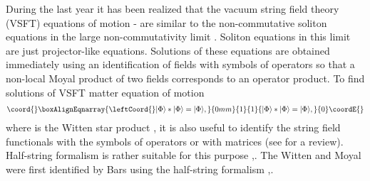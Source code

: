 \documentclass[a4paper,12pt]{article}
\begin{document}
During the last year it has been realized that
the  vacuum string field theory (VSFT) equations of motion
\cite{0012251}-\cite{0111129} are similar  to the non-commutative soliton
equations  in the large non-commutativity limit \cite{GMS}.
Soliton equations  in this limit are just  projector-like equations.
Solutions of these equations are obtained immediately using an identification
of fields with symbols of operators so that a non-local Moyal product
of two fields  corresponds to an operator product.
To find solutions of VSFT matter equation of motion
\begin{gather*}\coord{}\boxAlignEqnarray{
\leftCoord{}|\Phi\rangle*|\Phi\rangle=|\Phi\rangle,
}{0mm}{1}{1}{
|\Phi\rangle*|\Phi\rangle=|\Phi\rangle,
}{0}\coordE{}\end{gather*}
where \myHighlight{$*$}\coordHE{} is the Witten star product \cite{Witten},
it is also useful to identify the string field functionals
with the symbols of operators or with matrices (see \cite{ABGKM} for a review).
Half-string formalism is rather suitable for this purpose
\cite{0105058},\cite{0105059}.
The Witten \myHighlight{$*$}\coordHE{} and Moyal \myHighlight{$*$}\coordHE{} were first
identified by Bars using the half-string formalism
\cite{0106157},\cite{0202030}.
\end{document}
